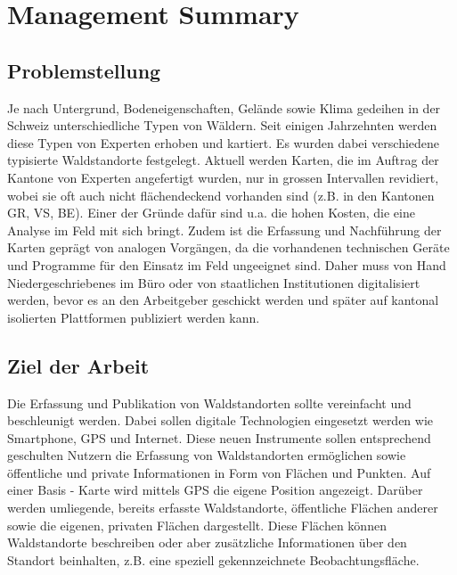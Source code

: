 \renewcommand\thesection{\arabic{section}}
\chapter{Management Summary}
\section{Problemstellung}
Je nach Untergrund, Bodeneigenschaften, Gel\"ande sowie Klima gedeihen in der Schweiz unterschiedliche Typen von W\"aldern. Seit einigen Jahrzehnten werden diese Typen von Experten erhoben und kartiert. Es wurden dabei verschiedene typisierte Waldstandorte festgelegt. Aktuell werden Karten, die im Auftrag der Kantone von Experten angefertigt wurden, nur in grossen Intervallen revidiert, wobei sie oft auch nicht fl\"achendeckend vorhanden sind (z.B. in den Kantonen GR, VS, BE).
Einer der Gr\"unde daf\"ur sind u.a. die hohen Kosten, die eine Analyse im Feld mit sich bringt.
Zudem ist die Erfassung und Nachf\"uhrung der Karten gepr\"agt von analogen Vorg\"angen, da die vorhandenen
technischen Ger\"ate und Programme f\"ur den Einsatz im Feld ungeeignet sind.
Daher muss von Hand Niedergeschriebenes im B\"uro oder von staatlichen Institutionen digitalisiert werden, bevor es an den
Arbeitgeber geschickt werden und sp\"ater auf kantonal isolierten Plattformen publiziert werden kann.

\section{Ziel der Arbeit}
Die Erfassung und Publikation von Waldstandorten sollte vereinfacht und beschleunigt werden. Dabei
sollen digitale Technologien eingesetzt werden wie Smartphone, GPS und Internet. Diese neuen
Instrumente sollen entsprechend geschulten Nutzern die Erfassung von Waldstandorten erm\"oglichen sowie \"offentliche und private Informationen in Form von Fl\"achen und Punkten. Auf einer Basis - Karte wird mittels GPS die eigene
Position angezeigt. Dar\"uber werden umliegende, bereits erfasste Waldstandorte, \"offentliche Fl\"achen anderer sowie die eigenen, privaten Fl\"achen dargestellt. Diese Fl\"achen k\"onnen Waldstandorte beschreiben oder aber zus\"atzliche Informationen \"uber den Standort beinhalten, z.B. eine speziell gekennzeichnete Beobachtungsfl\"ache.

